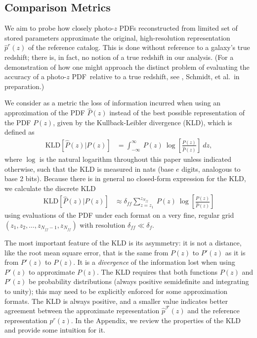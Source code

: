 \documentclass[\docopts]{\docclass}
\newcommand{\pz}{photo-$z$ PDF}
\begin{document}
\subsection{Comparison Metrics}
\label{sec:metric}

We aim to probe how closely \pz s reconstructed from limited set of stored 
parameters approximate the original, high-resolution representation 
$\hat{p}^{r}(z)$ of the reference catalog.
This is done without reference to a galaxy's true redshift; there is, in fact, 
no notion of a true redshift in our analysis.
(For a demonstration of how one might approach the distinct problem of 
evaluating the accuracy of a \pz\ relative to a true redshift, see 
\citet{polsterer_uncertain_2016}, Schmidt, et al.\ in preparation.)


We consider as a metric the loss of information incurred when using an 
approximation of the PDF $\hat{P}(z)$ instead of the best possible 
representation of the  PDF $P(z)$, given by the Kullback-Leibler divergence 
(KLD), which is defined as
\begin{align}
  \label{eq:kld}
  \mathrm{KLD}[\hat{P}(z) | P(z)] &= \int_{-\infty}^{\infty}\ P(z)\ 
\log\left[\frac{P(z)}{\hat{P}(z)}\right]\ dz,
\end{align}
where $\log$ is the natural logarithm throughout this paper unless indicated 
otherwise, such that the KLD is measured in nats (base $e$ digits, analogous to 
base 2 bits).
Because there is in general no closed-form expression for the KLD, we calculate 
the discrete KLD
\begin{align}
  \label{eq:kld_approx}
  \mathrm{KLD}[\hat{P}(z) | P(z)] &\approx 
\delta_{ff}\sum_{z=z_{1}}^{z_{N_{ff}}}\ P(z)\ 
\log\left[\frac{P(z)}{\hat{P}(z)}\right]
\end{align}
using evaluations of the PDF under each format on a very fine, regular grid 
$(z_{1}, z_{2}, \dots, z_{N_{ff}-1}, z_{N_{ff}})$ with resolution $\delta_{ff} 
\ll \delta_{f}$.

The most important feature of the KLD is its asymmetry: it is not a distance, 
like the root mean square error, that is the same from $P(z)$ to $P'(z)$ as it 
is from $P'(z)$ to $P(z)$.
It is a \textit{divergence} of the information lost when using $P'(z)$ to 
approximate $P(z)$.
The KLD requires that both functions $P(z)$ and $P'(z)$ be probability 
distributions (always positive semidefinite and integrating to unity); this may 
need to be explicitly enforced for some approximation formats.
The KLD is always positive, and a smaller value indicates better agreement 
between the approximate representation $\hat{p}^{\mathcal{F}}(z)$ and the 
reference representation $p^{r}(z)$.
In the Appendix, we review the properties of the KLD and provide some intuition 
for it.
\end{document}
